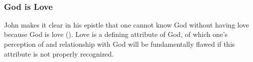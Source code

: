 \noindent
\blindtext
\\

\subsubsection{God is Love}
\noindent
John makes it clear in his epistle that one cannot know God without having love because God is love ().
Love is a defining attribute of God, of which one's perception of and relationship with God will be fundamentally flawed if this attribute is not properly recognized.
\\

\noindent
\blindtext
\\
